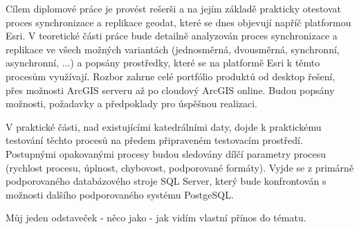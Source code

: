 
      Cílem diplomové práce je provést rešerši a na jejím základě
      prakticky otestovat proces synchronizace a replikace geodat, které
      se dnes objevují napříč platformou \gls{Esri}. V teoretické části práce
      bude detailně analyzován proces synchronizace a replikace ve všech
      možných variantách (jednosměrná, dvousměrná, synchronní,
      asynchronní, ...) a popsány prostředky, které se na platformě Esri k
      těmto procesům využívají. Rozbor zahrne celé portfólio produktů od
      desktop řešení, přes možnosti ArcGIS serveru až po cloudový ArcGIS
      online. Budou popsány možnosti, požadavky a předpoklady pro úspěšnou
      realizaci.

      V praktické části, nad existujícími katedrálními daty, dojde k
      praktickému testování těchto procesů na předem připraveném
      testovacím prostředí. Postupnými opakovanými procesy budou sledovány
      dílčí parametry procesu (rychlost procesu, úplnost, chybovost,
      podporované formáty). Vyjde se z primárně podporovaného databázového
      stroje SQL Server, který bude konfrontován s možnosti dalšího
      podporovaného systému PostgeSQL.

      Můj jeden odstaveček - něco jako - jak vidím vlastní přínos do tématu. 
